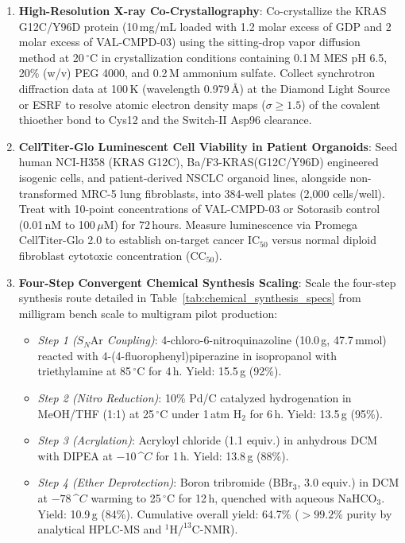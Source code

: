 \documentclass[10pt,journal,compsoc]{IEEEtran}
\begin{document}
\begin{enumerate}
    \item \textbf{High-Resolution X-ray Co-Crystallography}:
    Co-crystallize the KRAS G12C/Y96D protein (10\,mg/mL loaded with 1.2 molar excess of GDP and 2 molar excess of VAL-CMPD-03) using the sitting-drop vapor diffusion method at 20\,$^\circ$C in crystallization conditions containing 0.1\,M MES pH 6.5, 20\% (w/v) PEG 4000, and 0.2\,M ammonium sulfate. Collect synchrotron diffraction data at 100\,K (wavelength 0.979\,\AA) at the Diamond Light Source or ESRF to resolve atomic electron density maps ($\sigma \ge 1.5$) of the covalent thioether bond to Cys12 and the Switch-II Asp96 clearance.
    
    \item \textbf{CellTiter-Glo Luminescent Cell Viability in Patient Organoids}:
    Seed human NCI-H358 (KRAS G12C), Ba/F3-KRAS(G12C/Y96D) engineered isogenic cells, and patient-derived NSCLC organoid lines, alongside non-transformed MRC-5 lung fibroblasts, into 384-well plates (2,000 cells/well). Treat with 10-point concentrations of VAL-CMPD-03 or Sotorasib control (0.01\,nM to 100\,$\mu$M) for 72\,hours. Measure luminescence via Promega CellTiter-Glo 2.0 to establish on-target cancer $\text{IC}_{50}$ versus normal diploid fibroblast cytotoxic concentration ($\text{CC}_{50}$).
    
    \item \textbf{Four-Step Convergent Chemical Synthesis Scaling}:
    Scale the four-step synthesis route detailed in Table~\ref{tab:chemical_synthesis_specs} from milligram bench scale to multigram pilot production:
    \begin{itemize}
        \item \textit{Step 1 ($S_N\text{Ar}$ Coupling)}: 4-chloro-6-nitroquinazoline (10.0\,g, 47.7\,mmol) reacted with 4-(4-fluorophenyl)piperazine in isopropanol with triethylamine at 85\,$^\circ$C for 4\,h. Yield: 15.5\,g (92\%).
        \item \textit{Step 2 (Nitro Reduction)}: 10\% Pd/C catalyzed hydrogenation in MeOH/THF (1:1) at 25\,$^\circ$C under 1\,atm $\text{H}_2$ for 6\,h. Yield: 13.5\,g (95\%).
        \item \textit{Step 3 (Acrylation)}: Acryloyl chloride (1.1 equiv.) in anhydrous DCM with DIPEA at $-10\,$^\circ$C$ for 1\,h. Yield: 13.8\,g (88\%).
        \item \textit{Step 4 (Ether Deprotection)}: Boron tribromide ($\text{BBr}_3$, 3.0 equiv.) in DCM at $-78\,$^\circ$C$ warming to 25\,$^\circ$C for 12\,h, quenched with aqueous $\text{NaHCO}_3$. Yield: 10.9\,g (84\%). Cumulative overall yield: 64.7\% ($>99.2\%$ purity by analytical HPLC-MS and $^1\text{H}/^{13}\text{C}$-NMR).
    \end{itemize}
\end{enumerate}
\end{document}
